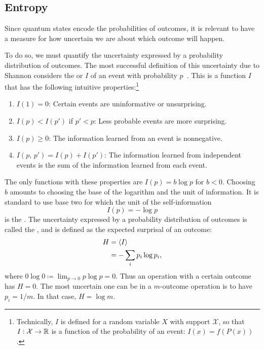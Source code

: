 \documentclass[../thesis.tex]{subfiles}
\begin{document}
\subsection{Entropy}

Since quantum states encode the probabilities of outcomes, it is relevant to
have a measure for how uncertain we are about which outcome will happen.

To do so, we must quantify the uncertainty expressed by a probability
distribution of outcomes. The most successful definition of this uncertainty due
to Shannon considers the  or  $I$ of an
event with probability $p$~\cite{shannonMathematicalTheoryCommunication1948}.
This is a function $I$ that has the following intuitive properties:\footnote{%
  Technically, $I$ is defined for a random variable $X$ with support
  $\mathcal{X}$, so that $I:\mathcal{X} \to \mathbb{R}$ is a function of the
  probability of an event: $I(x) = f(P(x))$.
}
\begin{enumerate}
  \item $I(1) = 0$: Certain events are uninformative or unsurprising.
  \item $I(p) < I(p')$ if $p' < p$: Less probable events are more surprising.
  \item $I(p) \ge 0$: The information learned from an event is nonnegative.
  \item $I(p,\, p') = I(p) + I(p')$: The information learned from independent
    events is the sum of the information learned from each event.
\end{enumerate}
The only functions with these properties are $I(p) = b\log p$ for $b < 0$.
Choosing $b$ amounts to choosing the base of the logarithm and the unit of
information. It is standard to use base two for which the unit of the
self-information
\begin{equation}
  I(p) = -\log p
  \label{eq:self-information}
\end{equation}
is the . The uncertainty expressed by a probability distribution of
outcomes is called the , and is defined as the expected
surprisal of an outcome:
\begin{align}
  H
  &= \ev{I} \\
  &= -\sum_i p_i \log p_i,
  \label{eq:entropy}
\end{align}
where $0 \log 0 \coloneqq \lim_{p \to 0} p \log p = 0$. Thus an operation with a
certain outcome has $H = 0$. The most uncertain one can be in a $m$-outcome
operation is to have $p_i = 1/m$. In that case, $H = \log m$.
\end{document}

